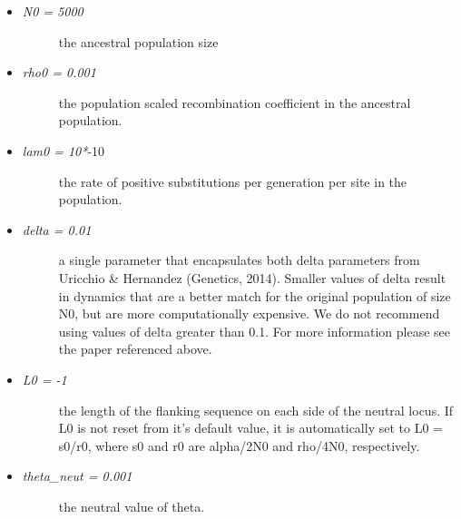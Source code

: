 \documentclass[letterpaper,10pt,english]{sphinxmanual}
\begin{document}
\begin{fulllineitems}
\begin{fulllineitems}
\begin{itemize}
\begin{itemize}
\begin{description}
\end{description}

\item {} \begin{description}
\item[{\emph{N0 = 5000} }] \leavevmode
the ancestral population size

\end{description}

\item {} \begin{description}
\item[{\emph{rho0 = 0.001} }] \leavevmode
the population scaled recombination coefficient
in the ancestral population.

\end{description}

\item {} \begin{description}
\item[{\emph{lam0 = 10*}-10 }] \leavevmode
the rate of positive substitutions per generation
per site in the population.

\end{description}

\item {} \begin{description}
\item[{\emph{delta = 0.01} }] \leavevmode
a single parameter that encapsulates both delta 
parameters from Uricchio \& Hernandez (Genetics, 2014).
Smaller values of delta result in dynamics that are a better
match for the original population of size N0, but are more 
computationally expensive.  We do not recommend using values
of delta greater than 0.1.  For more information please see the
paper referenced above.

\end{description}

\item {} \begin{description}
\item[{\emph{L0 = -1} }] \leavevmode
the length of the flanking sequence on each side of the
neutral locus. If L0 is not reset from it's default value, 
it is automatically set to L0 = s0/r0, where s0 and r0 are 
alpha/2N0 and rho/4N0, respectively.

\end{description}

\item {} \begin{description}
\item[{\emph{theta\_neut = 0.001} }] \leavevmode
the neutral value of theta.


\end{description}
\end{itemize}
\end{itemize}
\end{fulllineitems}
\end{fulllineitems}
\end{document}
